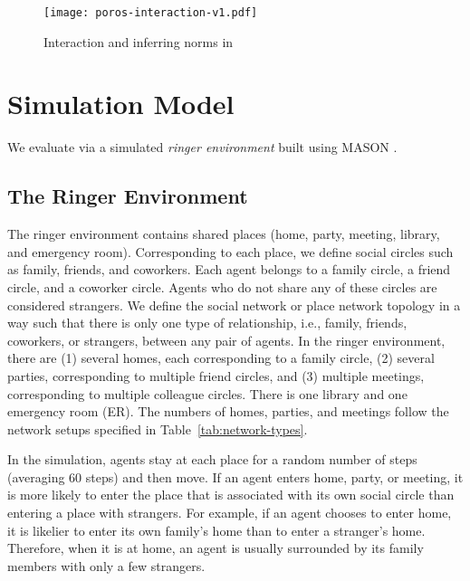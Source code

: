 \begin{figure}[!htb]
    \centering
    \texttt{[image: poros-interaction-v1.pdf]}
    \caption{Interaction and inferring norms in \frameworkB}
    \label{fig:poros-interaction}
\end{figure}

\section{Simulation Model}
\label{sec:Poros-simulation-model}

We evaluate \frameworkB via a simulated 
\emph{ringer environment} built using MASON \citep{Luke-2005-Mason}.

\subsection{The Ringer Environment}
The ringer environment contains shared places (home, party, meeting, library, and emergency room).
Corresponding to each place, we define social circles such as family, friends, and coworkers. Each agent belongs to a family circle, a friend circle, and a coworker circle. Agents who do not share any of these circles are considered strangers. We define the social network or place network topology in a way such that there is only one type of relationship, i.e., family, friends, coworkers, or strangers, between any pair of agents. 
In the ringer environment, there are (1) several homes, each corresponding to a family circle, (2) several parties, corresponding to multiple friend circles, and (3) multiple meetings, corresponding to multiple colleague circles. There is one library and one emergency room (ER). The numbers of homes, parties, and meetings follow the network setups specified in Table~\ref{tab:network-types}.

In the simulation, agents stay at each place for a random number of steps (averaging 60 steps) and then move. If an agent enters home, party, or meeting, it is more likely to enter the place that is associated with its own social circle than entering a place with strangers. For example, if an agent chooses to enter home, it is likelier to enter its own family's home than to enter a stranger's home. Therefore, when it is at home, an agent is usually surrounded by its family members with only a few strangers. 

